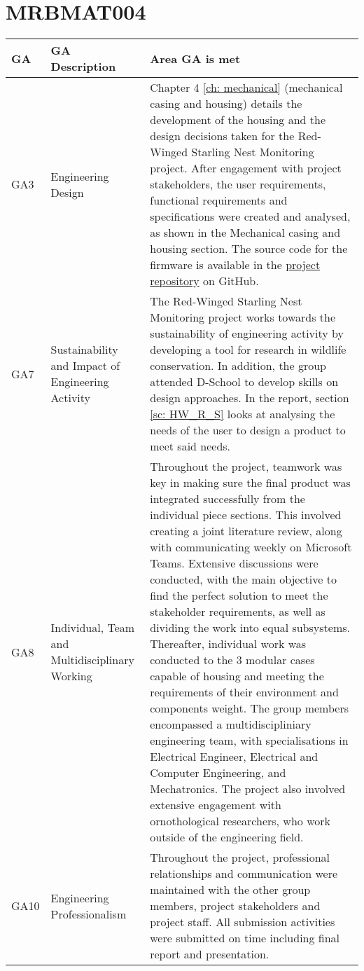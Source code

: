 \documentclass[class=report,11pt,crop=false]{standalone}
\begin{document}
\section{MRBMAT004}

\centering
\begin{tabularx}{\textwidth}{|p{} p{} X|}

    \hline
    \textbf{GA} & \textbf{GA Description} & \textbf{Area GA is met} \\ \hline

    GA3 & Engineering Design & Chapter 4  \ref{ch: mechanical} (mechanical casing and housing) details the development of the housing and the design decisions taken for the Red-Winged Starling Nest Monitoring project. After engagement with project stakeholders, the user requirements, functional requirements and specifications were created and analysed, as shown in the Mechanical casing and housing section.   The source code for the firmware is available in the \href{https://github.com/rothdu/EEE4113F-Group13-2024}{project repository} on GitHub.   \\ \hline

    GA7 & Sustainability and Impact of Engineering Activity & The Red-Winged Starling Nest Monitoring project works towards the sustainability of engineering activity by developing a tool for research in wildlife conservation.  In addition, the group attended D-School to develop skills on design approaches. In the report, section \ref{sc: HW_R_S} looks at analysing the needs of the user to design a product to meet said needs. \\ \hline

    GA8 & Individual, Team and Multidisciplinary Working & Throughout the project, teamwork was key in making sure the final product was integrated successfully from the individual piece sections. This involved creating a joint literature review, along with communicating weekly on Microsoft Teams. Extensive discussions were conducted, with the main objective to find the perfect solution to meet the stakeholder requirements, as well as dividing the work into equal subsystems. Thereafter, individual work was conducted to the 3 modular cases capable of housing and meeting the requirements of their environment and components weight. The group members encompassed a multidiscipliniary engineering team, with specialisations in Electrical Engineer, Electrical and Computer Engineering, and Mechatronics. The project also involved extensive engagement with ornothological researchers, who work outside of the engineering field. \\ \hline

    GA10 & Engineering Professionalism & Throughout the project, professional relationships and communication were maintained with the other group members, project stakeholders and project staff. All submission activities were submitted on time including final report and presentation.  \\ \hline


\end{tabularx}
\raggedright
\end{document}
